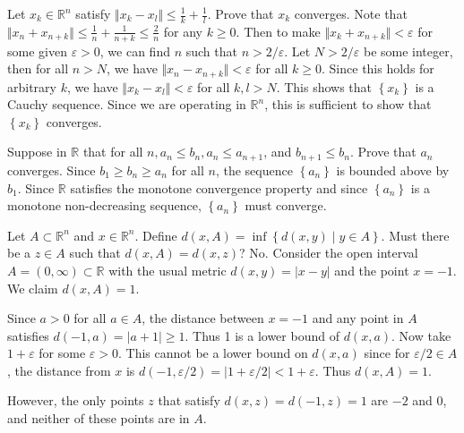 \documentclass[10pt]{amsart}
\theoremstyle{plain}
\newenvironment{exercise}[1]{%
  \renewcommand\themanualtheoreminner{#1}%
  \manualtheoreminner
}{\endmanualtheoreminner}
\theoremstyle{definition}
\begin{document}
\begin{exercise}{2.38}
	Let $x_k \in \mathbb{R}^n$ satisfy $\Vert{x_k-x_l}\Vert\leq \frac{1}{k} +\frac{1}{l} $. Prove that $x_k$ converges.
	\hrulefill
\end{exercise}
Note that $\Vert{x_n + x_{n+k}}\Vert \leq \frac{1}{n} + \frac{1}{n+k} \leq \frac{2}{n} $ for any $k\geq 0$. Then to make $\Vert{x_k + x_{n+k}}\Vert<\varepsilon$ for some given $\varepsilon>0$, we can find $n$  such that $n > 2 / \varepsilon$. Let $ N > 2 / \varepsilon$ be some integer, then for all $n > N$, we have $\Vert{x_n - x_{n+k}}\Vert<\varepsilon$ for all $k\geq 0$. Since this holds for arbitrary $k$, we have $\Vert{x_k-x_l}\Vert<\varepsilon$ for all $k,l > N$. This shows that $\left\{ x_k \right\}$ is a Cauchy sequence. Since we are operating in $\mathbb{R}^n$, this is sufficient to show that $ \left\{ x_k \right\}$ converges.


\begin{exercise}{2.40}
	Suppose in $\mathbb{R}$ that for all $n, a_n \leq b_n, a_n \leq a_{n+1}$, and $b_{n+1}\leq b_n$. Prove that $a_n$ converges.
	\hrulefill
\end{exercise}
Since $b_1 \geq b_n \geq a_n $ for all $n$, the sequence $\left\{ a_n \right\}$ is bounded above by $b_1$. Since $\mathbb{R}$ satisfies the monotone convergence property and since $\left\{ a_n \right\}$ is a monotone non-decreasing sequence, $ \left\{ a_n \right\}$ must converge.


\begin{exercise}{2.42}
	Let $A \subset \mathbb{R}^n$ and $x \in \mathbb{R}^n$. Define $d(x,A) = \inf\left\{ d(x,y) \;|\; y \in A \right\}$. Must there be a $z \in A$ such that $d(x,A) = d(x,z)$?
	\hrulefill
\end{exercise}
No. Consider the open interval $A=(0,\infty) \subset \mathbb{R}$ with the usual metric $d(x,y) = |x-y|$ and the point $x=-1$. We claim $d(x,A) = 1$.

Since $a > 0$ for all $a \in A$, the distance between $x=-1$ and any point in $A$ satisfies $d(-1,a) = |a+1| \geq 1$. Thus 1 is a lower bound of $d(x,a)$. Now take $1+\varepsilon$ for some $\varepsilon>0$. This cannot be a lower bound on $d(x,a)$ since for $\varepsilon/2 \in A$, the distance from $x$ is $d(-1,\varepsilon/2) = |1 + \varepsilon/2| < 1 + \varepsilon$. Thus $d(x,A) = 1$.

However, the only points $z$ that satisfy $d(x,z) = d(-1,z) = 1$ are $-2$ and $0$, and neither of these points are in $A$.
\end{document}
